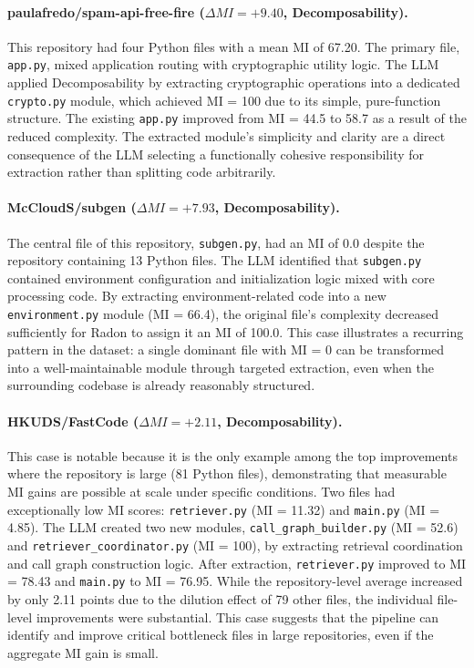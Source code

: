 \documentclass[sigconf,review,anonymous]{acmart}
\begin{document}
\paragraph{paulafredo/spam-api-free-fire ($\Delta MI = +9.40$, Decomposability).}
This repository had four Python files with a mean MI of 67.20. The primary file, \texttt{app.py}, mixed application routing with cryptographic utility logic. The LLM applied Decomposability by extracting cryptographic operations into a dedicated \texttt{crypto.py} module, which achieved MI = 100 due to its simple, pure-function structure. The existing \texttt{app.py} improved from MI = 44.5 to 58.7 as a result of the reduced complexity. The extracted module's simplicity and clarity are a direct consequence of the LLM selecting a functionally cohesive responsibility for extraction rather than splitting code arbitrarily.

\paragraph{McCloudS/subgen ($\Delta MI = +7.93$, Decomposability).}
The central file of this repository, \texttt{subgen.py}, had an MI of 0.0 despite the repository containing 13 Python files. The LLM identified that \texttt{subgen.py} contained environment configuration and initialization logic mixed with core processing code. By extracting environment-related code into a new \texttt{environment.py} module (MI = 66.4), the original file's complexity decreased sufficiently for Radon to assign it an MI of 100.0. This case illustrates a recurring pattern in the dataset: a single dominant file with MI = 0 can be transformed into a well-maintainable module through targeted extraction, even when the surrounding codebase is already reasonably structured.

\paragraph{HKUDS/FastCode ($\Delta MI = +2.11$, Decomposability).}
This case is notable because it is the only example among the top improvements where the repository is large (81 Python files), demonstrating that measurable MI gains are possible at scale under specific conditions. Two files had exceptionally low MI scores: \texttt{retriever.py} (MI = 11.32) and \texttt{main.py} (MI = 4.85). The LLM created two new modules, \texttt{call\_graph\_builder.py} (MI = 52.6) and \texttt{retriever\_coordinator.py} (MI = 100), by extracting retrieval coordination and call graph construction logic. After extraction, \texttt{retriever.py} improved to MI = 78.43 and \texttt{main.py} to MI = 76.95. While the repository-level average increased by only 2.11 points due to the dilution effect of 79 other files, the individual file-level improvements were substantial. This case suggests that the pipeline can identify and improve critical bottleneck files in large repositories, even if the aggregate MI gain is small.
\end{document}
